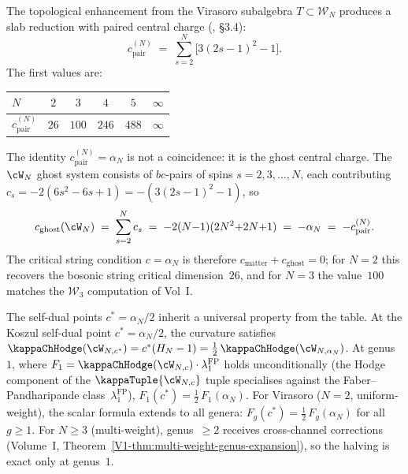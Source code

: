 \begin{proposition}
\label{prop:wn-slab-central-charges}
The topological enhancement from the Virasoro subalgebra $T \subset
\mathcal{W}_N$ produces a slab reduction with paired central charge
\textup{(}\!\cite{KZ25}, \S3.4\textup{)}:
\begin{equation}\label{eq:wn-cpair}
c_{\mathrm{pair}}^{(N)}
\;=\;
\sum_{s=2}^{N} \bigl[3(2s-1)^2 - 1\bigr].
\end{equation}
The first values are:
\begin{center}
\renewcommand{\arraystretch}{1.2}
\begin{tabular}{lccccc}
\toprule
$N$ & $2$ & $3$ & $4$ & $5$ & $\infty$ \\
\midrule
$c_{\mathrm{pair}}^{(N)}$ & $26$ & $100$ & $246$ & $488$ & $\infty$ \\
\bottomrule
\end{tabular}
\end{center}
The identity $c_{\mathrm{pair}}^{(N)} = \alpha_N$%
%
{} is not a coincidence: it is the ghost central
charge.\label{prop:ghost-identity-alphaN-active}
The $\cW_N$ ghost system consists of $bc$-pairs of spins
$s = 2, 3, \ldots, N$, each contributing
$c_s = -2(6s^2 - 6s + 1) = -(3(2s-1)^2 - 1)$, so
\[
c_{\mathrm{ghost}}(\cW_N)
\;=\; \sum_{s=2}^{N} c_s
\;=\; -2(N{-}1)(2N^2{+}2N{+}1)
\;=\; -\alpha_N
\;=\; -c_{\mathrm{pair}}^{(N)}.
\]
The critical string condition $c = \alpha_N$ is therefore
$c_{\mathrm{matter}} + c_{\mathrm{ghost}} = 0$;
for $N = 2$ this recovers the bosonic string critical dimension~$26$,
and for $N = 3$ the value~$100$ matches the $\mathcal{W}_3$ computation
of Vol~I.

The self-dual points $c^* = \alpha_N/2$ inherit a universal
property from the table.\label{prop:self-dual-halving}%
At the Koszul self-dual point $c^* = \alpha_N/2$, the
curvature satisfies
$\kappaChHodge(\cW_{N,c^*}) = c^*(H_N - 1) = \tfrac{1}{2}\,\kappaChHodge(\cW_{N,\alpha_N})$.
At genus~$1$, where $F_1 = \kappaChHodge(\cW_{N,c})\cdot\lambda_1^{\mathrm{FP}}$
holds unconditionally (the Hodge component of the
$\kappaTuple{\cW_{N,c}}$ tuple specialises against the
Faber--Pandharipande class~$\lambda_1^{\mathrm{FP}}$),
$F_1(c^*) = \tfrac{1}{2}\,F_1(\alpha_N)$.
For Virasoro ($N = 2$, uniform-weight), the scalar formula
extends to all genera: $F_g(c^*) = \tfrac{1}{2}\,F_g(\alpha_N)$ for all
$g \ge 1$. For $N \ge 3$ (multi-weight), genus~$\ge 2$ receives
cross-channel corrections
(Volume~I, Theorem~\ref{V1-thm:multi-weight-genus-expansion}),
so the halving is exact only at genus~$1$.
\end{proposition}

